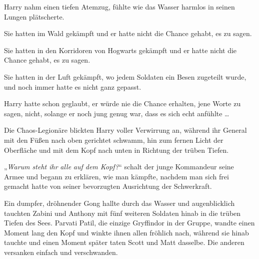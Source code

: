Harry nahm einen tiefen Atemzug, fühlte wie das Wasser harmlos in seinen Lungen plätscherte.

Sie hatten im Wald gekämpft und er hatte nicht die Chance gehabt, es zu sagen.

Sie hatten in den Korridoren von Hogwarts gekämpft und er hatte nicht die Chance gehabt, es zu sagen.

Sie hatten in der Luft gekämpft, wo jedem Soldaten ein Besen zugeteilt wurde, und noch immer hatte es nicht ganz gepasst.

Harry hatte schon geglaubt, er würde nie die Chance erhalten, jene Worte zu sagen, nicht, solange er noch jung genug war, dass es sich echt anfühlte …

Die Chaos-Legionäre blickten Harry voller Verwirrung an, während ihr General mit den Füßen nach oben gerichtet schwamm, hin zum fernen Licht der Oberfläche und mit dem Kopf nach unten in Richtung der trüben Tiefen.

„\emph{Warum steht ihr} \emph{alle} \emph{auf dem Kopf?}“ schalt der junge Kommandeur seine Armee und begann zu erklären, wie man kämpfte, nachdem man sich frei gemacht hatte von seiner bevorzugten Ausrichtung der Schwerkraft.

\later

Ein dumpfer, dröhnender Gong hallte durch das Wasser und augenblicklich tauchten Zabini und Anthony mit fünf weiteren Soldaten hinab in die trüben Tiefen des Sees. Parvati Patil, die einzige Gryffindor in der Gruppe, wandte einen Moment lang den Kopf und winkte ihnen allen fröhlich nach, während sie hinab tauchte und einen Moment später taten Scott und Matt dasselbe. Die anderen versanken einfach und verschwanden.

